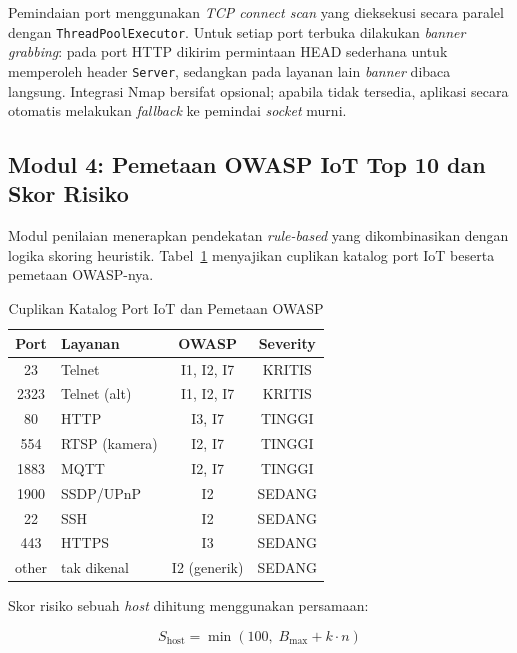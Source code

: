 \documentclass[conference]{IEEEtran}
\begin{document}
Pemindaian port menggunakan \textit{TCP connect scan} yang dieksekusi
secara paralel dengan \texttt{ThreadPoolExecutor}. Untuk setiap port
terbuka dilakukan \textit{banner grabbing}: pada port HTTP dikirim
permintaan HEAD sederhana untuk memperoleh header \texttt{Server},
sedangkan pada layanan lain \textit{banner} dibaca langsung. Integrasi
Nmap bersifat opsional; apabila tidak tersedia, aplikasi secara otomatis
melakukan \textit{fallback} ke pemindai \textit{socket} murni.

\subsection{Modul 4: Pemetaan OWASP IoT Top 10 dan Skor Risiko}

Modul penilaian menerapkan pendekatan \textit{rule-based} yang
dikombinasikan dengan logika skoring heuristik.
Tabel~\ref{tab:port_catalog} menyajikan cuplikan katalog port IoT beserta
pemetaan OWASP-nya.

\begin{table}[htbp]
\caption{Cuplikan Katalog Port IoT dan Pemetaan OWASP}
\label{tab:port_catalog}
\renewcommand{\arraystretch}{1.2}
\begin{tabular}{|c|l|c|c|}
\hline
\textbf{Port} & \textbf{Layanan} & \textbf{OWASP} & \textbf{Severity} \\
\hline
23    & Telnet        & I1, I2, I7  & KRITIS \\
\hline
2323  & Telnet (alt)  & I1, I2, I7  & KRITIS \\
\hline
80    & HTTP          & I3, I7      & TINGGI \\
\hline
554   & RTSP (kamera) & I2, I7      & TINGGI \\
\hline
1883  & MQTT          & I2, I7      & TINGGI \\
\hline
1900  & SSDP/UPnP     & I2          & SEDANG \\
\hline
22    & SSH           & I2          & SEDANG \\
\hline
443   & HTTPS         & I3          & SEDANG \\
\hline
other & tak dikenal   & I2 (generik)& SEDANG \\
\hline
\end{tabular}
\end{table}

Skor risiko sebuah \textit{host} dihitung menggunakan persamaan:

\begin{equation}
S_{\text{host}} = \min\!\left(100,\; B_{\max} + k \cdot n\right)
\label{eq:skor}
\end{equation}
\end{document}
